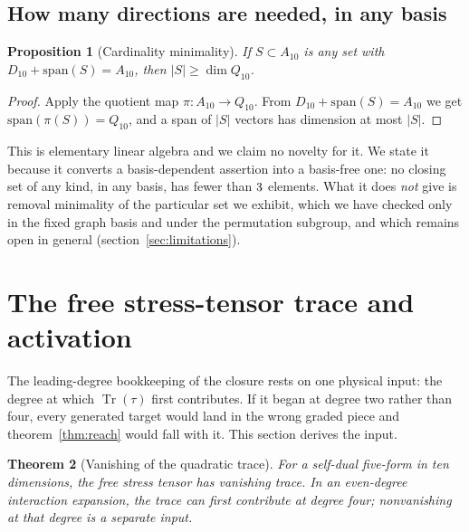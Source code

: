 \documentclass[11pt,a4paper]{article}
\newtheorem{theorem}{Theorem}
\newtheorem{proposition}[theorem]{Proposition}
\theoremstyle{definition}
\theoremstyle{remark}
\newcommand{\Ften}{A_{10}}
\newcommand{\Dten}{D_{10}}
\newcommand{\Qten}{Q_{10}}
\begin{document}
\subsection{How many directions are needed, in any basis}
\begin{proposition}[Cardinality minimality]
\label{prop:cardinality}
If $S \subset \Ften$ is any set with $\Dten + \mathrm{span}(S) = \Ften$, then
$|S| \ge \dim \Qten$.
\end{proposition}
\begin{proof}
Apply the quotient map $\pi: \Ften \to \Qten$. From
$\Dten + \mathrm{span}(S) = \Ften$ we get $\mathrm{span}(\pi(S)) = \Qten$, and a
span of $|S|$ vectors has dimension at most $|S|$.
\end{proof}
This is elementary linear algebra and we claim no novelty for it. We state it
because it converts a basis-dependent assertion into a basis-free one: no
closing set of any kind, in any basis, has fewer than $3$ elements. What
it does \emph{not} give is removal minimality of the particular set we exhibit,
which we have checked only in the fixed graph basis and under the permutation
subgroup, and which remains open in general (section~\ref{sec:limitations}).

\section{The free stress-tensor trace and activation}
\label{sec:gten}

The leading-degree bookkeeping of the closure rests on one physical input: the
degree at which $\operatorname{Tr}(\tau)$ first contributes. If it began at degree
two rather than four, every generated target would land in the wrong graded piece
and theorem~\ref{thm:reach} would fall with it. This section derives the input.

\begin{theorem}[Vanishing of the quadratic trace]
\label{thm:gten}
For a self-dual five-form in ten dimensions, the free stress tensor has vanishing
trace. In an even-degree interaction expansion, the trace can first
contribute at degree four; nonvanishing at that degree is a separate input.
\end{theorem}
\end{document}

